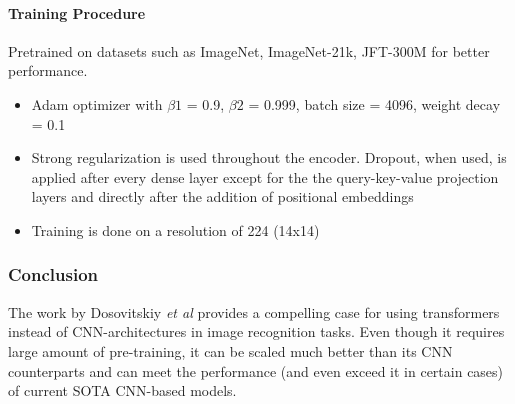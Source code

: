 \paragraph{Training Procedure}
\par Pretrained on datasets such as ImageNet, ImageNet-21k, JFT-300M for better performance.
\begin{itemize}
	\item Adam optimizer with $\beta1$ = 0.9, $\beta2$ = 0.999, batch size = 4096, weight decay = 0.1
	\item Strong regularization is used throughout the encoder. Dropout, when used, is applied after every dense layer except for the the query-key-value projection layers and directly after the addition of positional embeddings
	\item Training is done on a resolution of 224 (14x14)
\end{itemize}

\subsubsection{Conclusion}
\par The work by Dosovitskiy \textit{et al} provides a compelling case for using transformers instead of CNN-architectures in image recognition tasks. Even though it requires large amount of pre-training, it can be scaled much better than its CNN counterparts and can meet the performance (and even exceed it in certain cases) of current SOTA CNN-based models.
